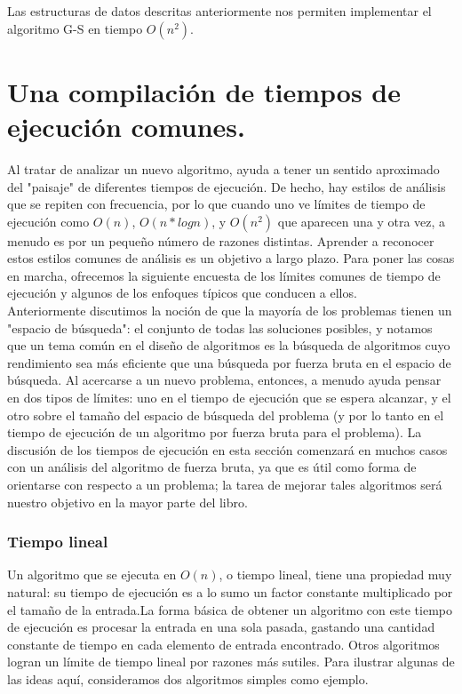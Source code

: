\documentclass[a4paper, 12pt]{book}
\begin{document}
Las estructuras de datos descritas anteriormente nos permiten implementar el algoritmo G-S en tiempo $O(n^2)$.\\

\section{Una compilación de tiempos de ejecución comunes.}

Al tratar de analizar un nuevo algoritmo, ayuda a tener un sentido aproximado del "paisaje" de diferentes tiempos de ejecución. De hecho, hay estilos de análisis que se repiten con frecuencia, por lo que cuando uno ve límites de tiempo de ejecución como $O(n)$, $O(n*log n)$, y $O(n^2)$ que aparecen una y otra vez, a menudo es por un pequeño número de razones distintas. Aprender a reconocer estos estilos comunes de análisis es un objetivo a largo plazo. Para poner las cosas en marcha, ofrecemos la siguiente encuesta de los límites comunes de tiempo de ejecución y algunos de los enfoques típicos que conducen a ellos.\\

Anteriormente discutimos la noción de que la mayoría de los problemas tienen un "espacio de búsqueda": el conjunto de todas las soluciones posibles, y notamos que un tema común en el diseño de algoritmos es la búsqueda de algoritmos cuyo rendimiento sea más eficiente que una búsqueda por fuerza bruta en el espacio de búsqueda. Al acercarse a un nuevo problema, entonces, a menudo ayuda pensar en dos tipos de límites: uno en el tiempo de ejecución que se espera alcanzar, y el otro sobre el tamaño del espacio de búsqueda del problema (y por lo tanto en el tiempo de ejecución de un algoritmo por fuerza bruta para el problema). La discusión de los tiempos de ejecución en esta sección comenzará en muchos casos con un análisis del algoritmo de fuerza bruta, ya que es útil como forma de orientarse con respecto a un problema; la tarea de mejorar tales algoritmos será nuestro objetivo en la mayor parte del libro.\\

\subsubsection*{Tiempo lineal} 

Un algoritmo que se ejecuta en $O(n)$, o tiempo lineal, tiene una propiedad muy natural: su tiempo de ejecución es a lo sumo un factor constante multiplicado por el tamaño de la entrada.La forma básica de obtener un algoritmo con este tiempo de ejecución es procesar la entrada en una sola pasada, gastando una cantidad constante de tiempo en cada elemento de entrada encontrado. Otros algoritmos logran un límite de tiempo lineal por razones más sutiles. Para ilustrar algunas de las ideas aquí, consideramos dos algoritmos simples como ejemplo.\\
\end{document}
